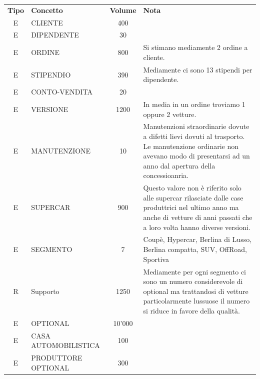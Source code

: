 \documentclass[12pt]{article}
\begin{document}
\begin{table}[htbp]
    \centering
    \small
    \begin{tabularx}{\textwidth}{c l c X }
        \rowcolor{red!20!}
        \textbf{Tipo} & \textbf{Concetto} & \textbf{Volume} & \textbf{Nota}\\
        E & CLIENTE & 400 & \\
        E & DIPENDENTE & 30 & \\
        E & ORDINE & 800 & Si stimano mediamente 2 ordine a cliente. \\
        E & STIPENDIO & 390 & Mediamente ci sono 13 stipendi per dipendente. \\
        E & CONTO-VENDITA & 20 & \\
        E & VERSIONE & 1200 & In media in un ordine troviamo 1 oppure 2 vetture.
        \\
        E & MANUTENZIONE & 10 & Manutenzioni straordinarie dovute a difetti
                                lievi dovuti al trasporto. Le manutenzione
                                ordinarie non avevano modo di presentarsi ad un
                                anno dal apertura della concessioanria. \\
        E & SUPERCAR & 900 & Questo valore non è riferito solo alle supercar
                                rilasciate dalle case produttrici nel ultimo
                                anno ma anche di vetture di anni passati che a
                                loro volta hanno diverse versioni. \\
        
        E & SEGMENTO & 7 & Coupè, Hypercar, Berlina di Lusso, Berlina compatta,
        SUV, OffRoad, Sportiva \\
        R & Supporto & 1250 & Mediamente per ogni segmento ci sono un numero
                                considerevole di optional ma trattandosi di
                                vetture particolarmente lussuose il numero si
                                riduce in favore della qualità. \\
        E & OPTIONAL & 10'000 & \\
        E & CASA AUTOMOBILISTICA & 100 & \\
        E & PRODUTTORE OPTIONAL & 300 & \\  
        
    \end{tabularx}
    \label{tab:volume_table}
\end{table}
\end{document}

